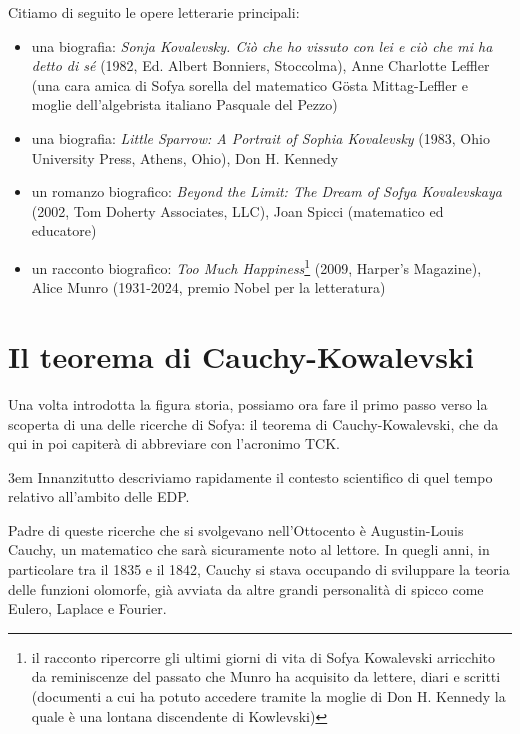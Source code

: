 Citiamo di seguito le opere letterarie principali:
\begin{itemize}

\item una biografia: \textit{Sonja Kovalevsky. Ciò che ho vissuto con lei e ciò che mi ha detto di sé} (1982, Ed. Albert
Bonniers, Stoccolma), Anne Charlotte Leffler (una cara amica di Sofya sorella del matematico Gösta Mittag-Leffler e moglie dell'algebrista italiano Pasquale del Pezzo)

\item una biografia: \textit{Little Sparrow: A Portrait of Sophia Kovalevsky} (1983,
Ohio University Press, Athens, Ohio), Don H. Kennedy

\item un romanzo biografico: \textit{Beyond the Limit: The Dream of Sofya Kovalevskaya} (2002, Tom
Doherty Associates, LLC), Joan Spicci (matematico ed educatore)

\item un racconto biografico: \textit{Too Much Happiness}\footnote{ il racconto ripercorre gli ultimi giorni
di vita di Sofya Kowalevski arricchito da reminiscenze del passato
che Munro ha acquisito da lettere, diari e scritti (documenti a cui ha potuto
accedere tramite la moglie di Don H. Kennedy la quale è una lontana discendente di Kowlevski)} 
(2009, Harper's Magazine), Alice Munro (1931-2024, premio Nobel per la letteratura)

\end{itemize}

\section{Il teorema di Cauchy-Kowalevski}

Una volta introdotta la figura storia, possiamo ora fare il primo passo verso la scoperta di una delle ricerche di Sofya: il teorema di Cauchy-Kowalevski, che da qui in poi capiterà di abbreviare con l'acronimo TCK.

\emergencystretch 3em
Innanzitutto descriviamo rapidamente il contesto scientifico di quel tempo relativo all'ambito delle EDP. 

Padre di queste ricerche che si svolgevano nell'Ottocento è Augustin-Louis Cauchy, un matematico che sarà sicuramente noto al lettore. In quegli anni, in particolare tra il 1835 e il 1842, Cauchy si stava occupando di sviluppare la teoria delle funzioni olomorfe, già avviata da altre grandi personalità di spicco come Eulero, Laplace e Fourier.

